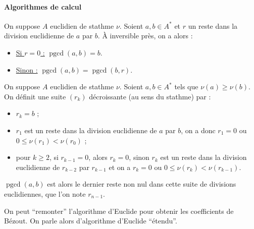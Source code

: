  \paragraph{Algorithmes de calcul}



  \begin{lemma}
    On suppose $A$ euclidien de stathme $\nu$. Soient $a, b \in A^*$ et $r$ un reste dans la division euclidienne de $a$ par $b$. À inversible près, on a alors :
    \begin{itemize}
      \item \uline{Si $r = 0$ :} $\operatorname{pgcd}(a,b) = b$.
      \item \uline{Sinon :} $\operatorname{pgcd}(a,b) = \operatorname{pgcd}(b,r)$.
    \end{itemize}
  \end{lemma}

  \begin{theorem}
    \label{142-1}
    On suppose $A$ euclidien de stathme $\nu$. Soient $a, b \in A^*$ tels que $\nu(a) \geq \nu(b)$. On définit une suite $(r_k)$ décroissante (au sens du stathme) par :
    \begin{itemize}
      \item $r_k = b$ ;
      \item $r_1$ est un reste dans la division euclidienne de $a$ par $b$, on a donc $r_1 = 0$ ou $0 \leq \nu(r_1) < \nu(r_0)$ ;
      \item pour $k \geq 2$, si $r_{k-1} = 0$, alors $r_k = 0$, sinon $r_k$ est un reste dans la division euclidienne de $r_{k-2}$ par $r_{k-1}$ et on a $r_k = 0$ ou $0 \leq \nu(r_k) < \nu(r_{k-1})$.
    \end{itemize}
    $\operatorname{pgcd}(a,b)$ est alors le dernier reste non nul dans cette suite de divisions euclidiennes, que l'on note $r_{n-1}$.
  \end{theorem}

  \begin{remark}
    On peut ``remonter'' l'algorithme d'Euclide pour obtenir les coefficients de Bézout. On parle alors d'algorithme d'Euclide ``étendu''.
  \end{remark}

